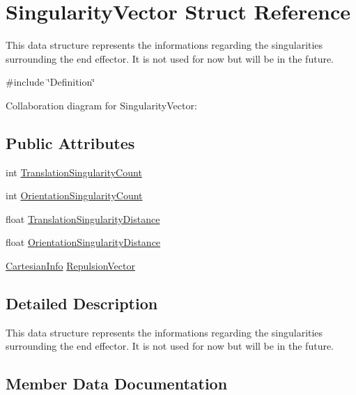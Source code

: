 \hypertarget{struct_singularity_vector}{}\section{Singularity\+Vector Struct Reference}
\label{struct_singularity_vector}


This data structure represents the informations regarding the singularities surrounding the end effector. It is not used for now but will be in the future.  




{\ttfamily \#include \char`\"{}Definition\char`\"{}}



Collaboration diagram for Singularity\+Vector\+:
\subsection*{Public Attributes}
\begin{DoxyCompactItemize}
\item 
int \hyperlink{struct_singularity_vector_ac65570b58281f94cea000ede75de19ae}{Translation\+Singularity\+Count}
\item 
int \hyperlink{struct_singularity_vector_a7ea72e4a459d41c935135c581e6763b1}{Orientation\+Singularity\+Count}
\item 
float \hyperlink{struct_singularity_vector_affe09808366cb7e82427a978cbb1af6a}{Translation\+Singularity\+Distance}
\item 
float \hyperlink{struct_singularity_vector_ae04b0dd5f44b2d696d36860ecb7b9f35}{Orientation\+Singularity\+Distance}
\item 
\hyperlink{struct_cartesian_info}{Cartesian\+Info} \hyperlink{struct_singularity_vector_adc7115ff6fe262ef37a1bff2ebbdbfee}{Repulsion\+Vector}
\end{DoxyCompactItemize}


\subsection{Detailed Description}
This data structure represents the informations regarding the singularities surrounding the end effector. It is not used for now but will be in the future. 

\subsection{Member Data Documentation}
